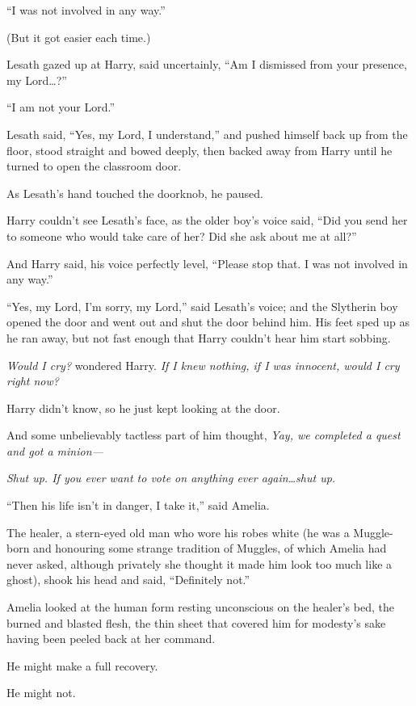 “I was not involved in any way.”

(But it got easier each time.)

Lesath gazed up at Harry, said uncertainly, “Am I dismissed from your presence, my Lord…?”

“I am not your Lord.”

Lesath said, “Yes, my Lord, I understand,” and pushed himself back up from the floor, stood straight and bowed deeply, then backed away from Harry until he turned to open the classroom door.

As Lesath’s hand touched the doorknob, he paused.

Harry couldn’t see Lesath’s face, as the older boy’s voice said, “Did you send her to someone who would take care of her? Did she ask about me at all?”

And Harry said, his voice perfectly level, “Please stop that. I was not involved in any way.”

“Yes, my Lord, I’m sorry, my Lord,” said Lesath’s voice; and the Slytherin boy opened the door and went out and shut the door behind him. His feet sped up as he ran away, but not fast enough that Harry couldn’t hear him start sobbing.

\emph{Would I cry?} wondered Harry. \emph{If I knew nothing, if I was innocent, would I cry right now?}

Harry didn’t know, so he just kept looking at the door.

And some unbelievably tactless part of him thought, \emph{Yay, we completed a quest and got a minion—}

\emph{Shut up. If you ever want to vote on anything ever again…shut up.}


“Then his life isn’t in danger, I take it,” said Amelia.

The healer, a stern-eyed old man who wore his robes white (he was a Muggle-born and honouring some strange tradition of Muggles, of which Amelia had never asked, although privately she thought it made him look too much like a ghost), shook his head and said, “Definitely not.”

Amelia looked at the human form resting unconscious on the healer’s bed, the burned and blasted flesh, the thin sheet that covered him for modesty’s sake having been peeled back at her command.

He might make a full recovery.

He might not.

